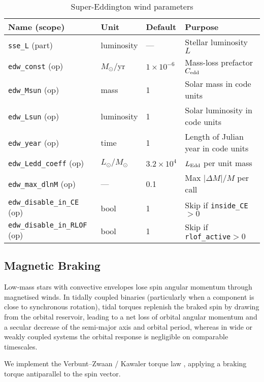 \documentclass[11pt]{article}
\begin{document}
\begin{table}[h]
\centering\footnotesize
\caption{Super-Eddington wind parameters}
\label{tab:edw}
\begin{tabular}{@{}llll@{}}
\toprule
Name (scope) & Unit & Default & Purpose \\
\midrule
\texttt{sse\_L} (part) & luminosity & — & Stellar luminosity $L$\\
\texttt{edw\_const} (op) & $M_\odot$/yr & $1\times10^{-6}$ & Mass-loss prefactor $C_{\rm edd}$\\
\texttt{edw\_Msun}  (op) & mass & 1 & Solar mass in code units\\
\texttt{edw\_Lsun}  (op) & luminosity & 1 & Solar luminosity in code units\\
\texttt{edw\_year}  (op) & time & 1 & Length of Julian year in code units\\
\texttt{edw\_Ledd\_coeff} (op) & $L_\odot/M_\odot$ & $3.2\times10^{4}$ & $L_{\rm Edd}$ per unit mass\\
\texttt{edw\_max\_dlnM} (op) & — & 0.1 & Max $|\Delta M|/M$ per call\\
\texttt{edw\_disable\_in\_CE} (op) & bool & 1 & Skip if \texttt{inside\_CE}$>0$\\
\texttt{edw\_disable\_in\_RLOF} (op) & bool & 1 & Skip if \texttt{rlof\_active}$>0$\\
\bottomrule
\end{tabular}
\end{table}
\subsection{Magnetic Braking}
\label{sec:mb}

Low‑mass stars with convective envelopes lose spin angular momentum through
magnetised winds. In tidally coupled binaries (particularly when a component is close to synchronous rotation), tidal torques replenish the braked spin by drawing from the orbital reservoir, leading to a net loss of orbital angular momentum and a secular decrease of the semi‑major axis and orbital period, whereas in wide or weakly coupled systems the orbital response is negligible on comparable timescales.

We implement the Verbunt--Zwaan / Kawaler torque law
\citep{Verbunt1981,Kawaler1988}, applying a braking torque antiparallel to the
spin vector.
\end{document}
